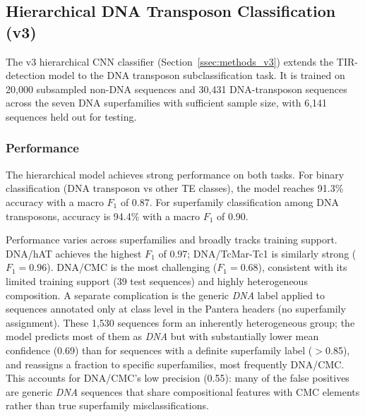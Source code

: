 \documentclass[12pt]{article}
\begin{document}
\subsection{Hierarchical DNA Transposon Classification (v3)}\label{ssec:hier}

The v3 hierarchical CNN classifier (Section~\ref{ssec:methods_v3}) extends the TIR-detection model to the DNA transposon subclassification task. It is trained on 20{,}000 subsampled non-DNA sequences and 30{,}431 DNA-transposon sequences across the seven DNA superfamilies with sufficient sample size, with 6{,}141 sequences held out for testing. 

\subsubsection{Performance}

The hierarchical model achieves strong performance on both tasks. For binary classification (DNA transposon vs other TE classes), the model reaches 91.3\% accuracy with a macro $F_1$ of 0.87. For superfamily classification among DNA transposons, accuracy is 94.4\% with a macro $F_1$ of 0.90.

Performance varies across superfamilies and broadly tracks training support. DNA/hAT achieves the highest $F_1$ of 0.97; DNA/TcMar-Tc1 is similarly strong ($F_1 = 0.96$). DNA/CMC is the most challenging ($F_1 = 0.68$), consistent with its limited training support (39 test sequences) and highly heterogeneous composition. A separate complication is the generic \textit{DNA} label applied to sequences annotated only at class level in the Pantera headers (no superfamily assignment). These 1{,}530 sequences form an inherently heterogeneous group; the model predicts most of them as \textit{DNA} but with substantially lower mean confidence (0.69) than for sequences with a definite superfamily label ($>$0.85), and reassigns a fraction to specific superfamilies, most frequently DNA/CMC. This accounts for DNA/CMC's low precision (0.55): many of the false positives are generic \textit{DNA} sequences that share compositional features with CMC elements rather than true superfamily misclassifications.
\end{document}
